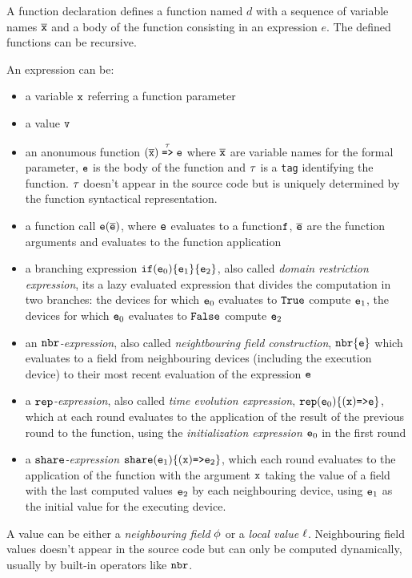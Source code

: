 A function declaration defines a function named $d$ with a sequence of variable names $\overline{\mathtt{x}}$ and a body of the function consisting in an expression $e$. The defined functions can be recursive.

An expression can be:
\begin{itemize}
\item a variable $\mathtt{x}$ referring a function parameter
\item a value $\mathtt{v}$
\item an anonumous function $(\overline{\mathtt{x}}) \stackrel{\tau}{\mathrm{\texttt{=>}}} \mathtt{e}$  where $\overline{\mathtt{x}}$ are variable names for the formal parameter, $\mathtt{e}$ is the body of the function and $\tau$ is a \texttt{tag} identifying the function. $\tau$ doesn't appear in the source code but is uniquely determined by the function syntactical representation.
\item a function call $\mathtt{e}(\overline{\mathtt{e}})$, where $\mathtt{e}$ evaluates to a function$\mathtt{f}$, $\overline{\mathtt{e}}$ are the function arguments and evaluates to the function application
\item a {branching expression} $\mathtt{if} (\mathtt{e}_0) \{\mathtt{e}_1\} \{\mathtt{e}_2\}$, also called  \textit{domain restriction expression}, its a lazy evaluated expression that divides the computation in two branches: the devices for which $\mathtt{e}_0$ evaluates to $\mathtt{True}$ compute $\mathtt{e}_1$, the devices for which $\mathtt{e}_0$ evaluates to $\mathtt{False}$ compute $\mathtt{e}_2$
\item an \textit{$\mathtt{nbr}$-expression}, also called \textit{neightbouring field construction}, $\mathtt{nbr}\{\mathtt{e}\}$ which evaluates to a field from neighbouring devices (including the execution device) to their most recent evaluation of the expression $\mathtt{e}$
\item a \textit{$\mathtt{rep}$-expression}, also called \textit{time evolution expression}, $\mathtt{rep}(\mathtt{e}_0)\{ (\mathtt{x}) \mathrm{ \texttt{=>}\mathtt{e} } \}$, which at each round evaluates to the application of the result of the previous round to the function, using the \textit{initialization expression} $\mathtt{e}_0$ in the first round
\item a \textit{$\mathtt{share}$-expression} $\mathtt{share}(\mathtt{e}_1)\{(\mathtt{x}) \mathrm{ \texttt{=>}\mathtt{e} }_2 \}$, which each round evaluates to the application of the function with the argument $\mathtt{x}$ taking the value of a field with the last computed values $\mathtt{e}_2$ by each neighbouring device, using $\mathtt{e}_1$ as the initial value for the executing device.
\end{itemize}

A value can be either a \textit{neighbouring field} $\phi$ or a \textit{local value} $\ell$. Neighbouring field values doesn't appear in the source code but can only be computed dynamically, usually by built-in operators like $\mathtt{nbr}$.

